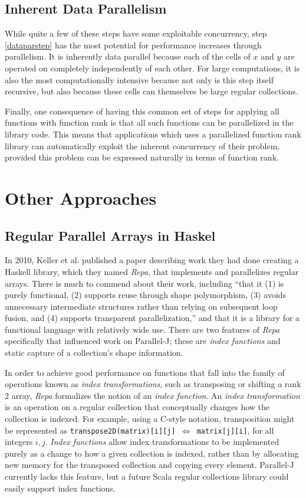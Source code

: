 \subsection{Inherent Data Parallelism}
While quite a few of these steps have some exploitable concurrency, 
step \ref{dataparstep} has the most potential for performance increases through parallelism.
It is inherently data parallel because each of the cells of $x$ and $y$ are operated on completely independently of each other.
For large computations, it is also the most computationally intensive 
because not only is this step itself recursive, but
also because these cells can themselves be large regular collections.

Finally, one consequence of having this common set of steps for applying all functions with function rank is
that all such functions can be parallelized in the library code.
This means that applications which uses a parallelized function rank library 
can automatically exploit the inherent concurrency of their problem, 
provided this problem can be expressed naturally in terms of function rank.

\section{Other Approaches}
\subsection{Regular Parallel Arrays in Haskel}
\label{repa}
In 2010, Keller et al. published a paper\cite{dph} 
describing work they had done creating a Haskell library, which they named \textit{Repa}, that implements and parallelizes regular arrays.
There is much to commend about their work, including ``that it (1) is purely
functional, (2) supports reuse through shape polymorphism, (3)
avoids unnecessary intermediate structures rather than relying on
subsequent loop fusion, and (4) supports transparent parallelization,''
and that it is a library for a functional language with relatively wide use. 
There are two features of \textit{Repa} specifically 
that influenced work on Parallel-J; 
these are \textit{index functions} and static capture of a collection's shape information.

In order to achieve good performance on functions 
that fall into the family of operations known as \textit{index transformations}, 
such as transposing or shifting a rank 2 array, 
\textit{Repa} formalizes the notion of an \textit{index function}. 
An \textit{index transformation} is an operation on a regular collection that 
conceptually changes how the collection is indexed. 
For example, using a C-style notation, transposition might be represented as 
\texttt{transpose2D(matrix)[i][j] $\Leftrightarrow$ matrix[j][i]}, for all integers $i,j$. 
\textit{Index functions} allow index transformations to be implemented purely as 
a change to how a given collection is indexed, 
rather than by allocating new memory for the transposed collection and copying every element. 
Parallel-J currently lacks this feature, 
but a future Scala regular collections library could easily support index functions.

